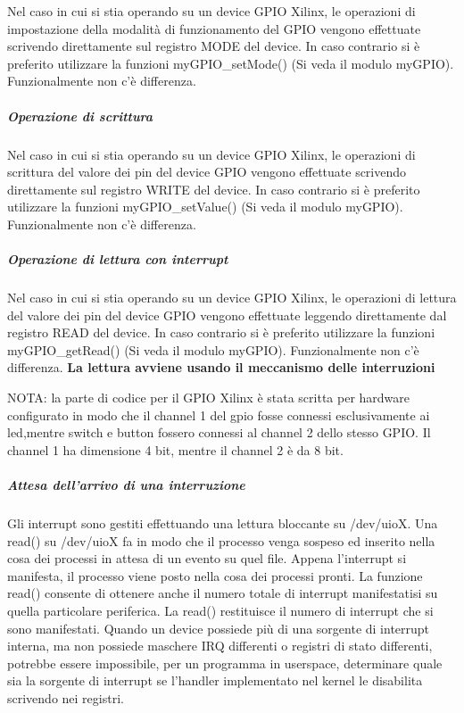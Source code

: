 Nel caso in cui si stia operando su un device G\+P\+I\+O Xilinx, le operazioni di impostazione della modalità di funzionamento del G\+P\+I\+O vengono effettuate scrivendo direttamente sul registro M\+O\+D\+E del device. In caso contrario si è preferito utilizzare la funzioni my\+G\+P\+I\+O\+\_\+set\+Mode() (Si veda il modulo my\+G\+P\+I\+O). Funzionalmente non c'è differenza.

\subparagraph*{Operazione di scrittura}

Nel caso in cui si stia operando su un device G\+P\+I\+O Xilinx, le operazioni di scrittura del valore dei pin del device G\+P\+I\+O vengono effettuate scrivendo direttamente sul registro W\+R\+I\+T\+E del device. In caso contrario si è preferito utilizzare la funzioni my\+G\+P\+I\+O\+\_\+set\+Value() (Si veda il modulo my\+G\+P\+I\+O). Funzionalmente non c'è differenza.

\subparagraph*{Operazione di lettura con interrupt}

Nel caso in cui si stia operando su un device G\+P\+I\+O Xilinx, le operazioni di lettura del valore dei pin del device G\+P\+I\+O vengono effettuate leggendo direttamente dal registro R\+E\+A\+D del device. In caso contrario si è preferito utilizzare la funzioni my\+G\+P\+I\+O\+\_\+get\+Read() (Si veda il modulo my\+G\+P\+I\+O). Funzionalmente non c'è differenza. {\bfseries La lettura avviene usando il meccanismo delle interruzioni}

N\+O\+T\+A\+: la parte di codice per il G\+P\+I\+O Xilinx è stata scritta per hardware configurato in modo che il channel 1 del gpio fosse connessi esclusivamente ai led,mentre switch e button fossero connessi al channel 2 dello stesso G\+P\+I\+O. Il channel 1 ha dimensione 4 bit, mentre il channel 2 è da 8 bit.

\subparagraph*{Attesa dell'arrivo di una interruzione}

Gli interrupt sono gestiti effettuando una lettura bloccante su /dev/uio\+X. Una read() su /dev/uio\+X fa in modo che il processo venga sospeso ed inserito nella cosa dei processi in attesa di un evento su quel file. Appena l'interrupt si manifesta, il processo viene posto nella cosa dei processi pronti. La funzione read() consente di ottenere anche il numero totale di interrupt manifestatisi su quella particolare periferica. La read() restituisce il numero di interrupt che si sono manifestati. Quando un device possiede più di una sorgente di interrupt interna, ma non possiede maschere I\+R\+Q differenti o registri di stato differenti, potrebbe essere impossibile, per un programma in userspace, determinare quale sia la sorgente di interrupt se l'handler implementato nel kernel le disabilita scrivendo nei registri.

